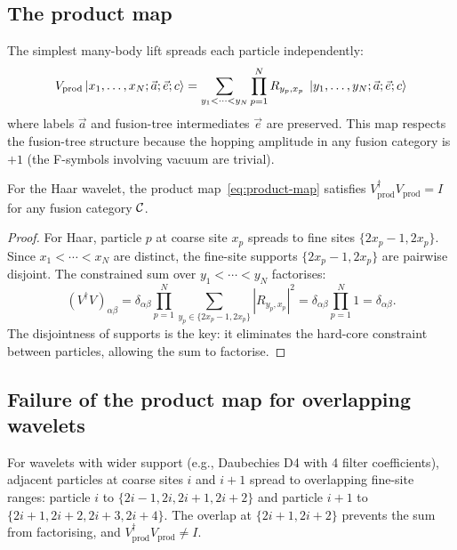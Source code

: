 \subsection{The product map}
\label{sec:product-map}

The simplest many-body lift spreads each particle independently:
\begin{equation}
\label{eq:product-map}
    V_{\mathrm{prod}}\ket{x_1, \ldots, x_N; \vec{a}; \vec{e}; c}
    = \sum_{\substack{y_1 < \cdots < y_N}} \prod_{p=1}^N R_{y_p, x_p} \; \ket{y_1, \ldots, y_N; \vec{a}; \vec{e}; c}
\end{equation}
where labels $\vec{a}$ and fusion-tree intermediates $\vec{e}$ are preserved. This map respects the fusion-tree structure because the hopping amplitude in any fusion category is $+1$ (the F-symbols involving vacuum are trivial).

\begin{proposition}
\label{prop:haar-isometry}
For the Haar wavelet, the product map~\eqref{eq:product-map} satisfies $V_{\mathrm{prod}}^\dagger V_{\mathrm{prod}} = I$ for any fusion category $\mathcal{C}$.
\end{proposition}

\begin{proof}
For Haar, particle $p$ at coarse site $x_p$ spreads to fine sites $\{2x_p - 1, 2x_p\}$. Since $x_1 < \cdots < x_N$ are distinct, the fine-site supports $\{2x_p - 1, 2x_p\}$ are pairwise disjoint. The constrained sum over $y_1 < \cdots < y_N$ factorises:
\begin{equation}
    (V^\dagger V)_{\alpha\beta} = \delta_{\alpha\beta} \prod_{p=1}^N \sum_{y_p \in \{2x_p - 1, 2x_p\}} |R_{y_p, x_p}|^2 = \delta_{\alpha\beta} \prod_{p=1}^N 1 = \delta_{\alpha\beta}.
\end{equation}
The disjointness of supports is the key: it eliminates the hard-core constraint between particles, allowing the sum to factorise.
\end{proof}

\subsection{Failure of the product map for overlapping wavelets}

For wavelets with wider support (e.g., Daubechies D4 with 4 filter coefficients), adjacent particles at coarse sites $i$ and $i+1$ spread to overlapping fine-site ranges: particle $i$ to $\{2i{-}1, 2i, 2i{+}1, 2i{+}2\}$ and particle $i{+}1$ to $\{2i{+}1, 2i{+}2, 2i{+}3, 2i{+}4\}$. The overlap at $\{2i{+}1, 2i{+}2\}$ prevents the sum from factorising, and $V_{\mathrm{prod}}^\dagger V_{\mathrm{prod}} \neq I$.

